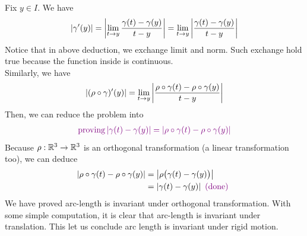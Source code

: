 \documentclass{report}
\begin{document}
Fix $y \in I$. We have
\begin{align*}
\left|\gamma '(y)\right|= \left|\lim_{t\to y}\frac{\gamma (t)-\gamma (y)}{t-y}\right|=\lim_{t\to y} \left|\frac{\gamma (t)-\gamma (y)}{t-y}\right| 
\end{align*}
Notice that in above deduction, we exchange limit and norm. Such exchange hold true because the function inside is continuous.\\

Similarly, we have 
\begin{align*}
\left|(\rho \circ \gamma )'(y)\right|=\lim_{t\to y} \left|\frac{\rho \circ \gamma (t)-\rho \circ  \gamma (y)}{t-y}\right|
\end{align*}
Then, we can reduce the problem into 
\begin{align*}
\textcolor{violet}{\text{proving} \left|\gamma (t)-\gamma (y)\right|=\left|\rho \circ \gamma (t)-\rho \circ \gamma (y)\right|}
\end{align*} 
Because $\rho:\mathbb{R}^3\rightarrow \mathbb{R}^3$ is an orthogonal transformation (a linear transformation too), we can deduce 
\begin{align*}
\left|\rho \circ \gamma (t)-\rho \circ  \gamma (y)\right|&=\left|\rho \big(\gamma (t)-\gamma (y) \big)\right|\\
&=\left|\gamma (t)-\gamma (y)\right|\textcolor{violet}{\text{ (done) }}
\end{align*}
We have proved arc-length is invariant under orthogonal transformation. With some simple computation, it is clear that arc-length is invariant under translation. This let us conclude arc length is invariant under rigid motion.\\
\end{document}
